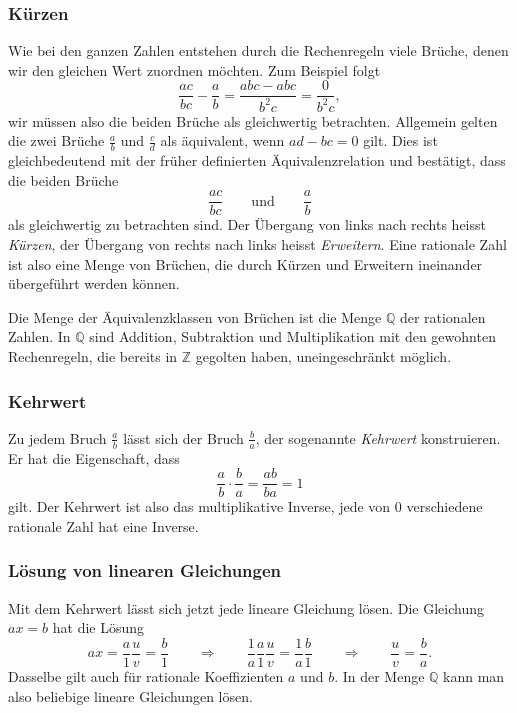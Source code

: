 \subsubsection{Kürzen}
Wie bei den ganzen Zahlen entstehen durch die Rechenregeln viele Brüche,
denen wir den gleichen Wert zuordnen möchten.
Zum Beispiel folgt
\[
\frac{ac}{bc} - \frac{a}{b} 
=
\frac{abc-abc}{b^2c}
=
\frac{0}{b^2c},
\]
wir müssen also die beiden Brüche als gleichwertig betrachten.
Allgemein gelten die zwei Brüche $\frac{a}{b}$ und $\frac{c}{d}$
als äquivalent, wenn $ad-bc= 0$ gilt.
Dies ist gleichbedeutend mit der früher definierten Äquivalenzrelation
und bestätigt, dass die beiden Brüche
\[
\frac{ac}{bc} 
\qquad\text{und}\qquad
\frac{a}{b}
\]
als gleichwertig zu betrachten sind.
Der Übergang von links nach rechts heisst {\em Kürzen},
%
der Übergang von rechts nach links heisst {\em Erweitern}.
%
Eine rationale Zahl ist also eine Menge von Brüchen, die durch
Kürzen und Erweitern ineinander übergeführt werden können.

Die Menge der Äquivalenzklassen von Brüchen ist die Menge $\mathbb{Q}$
der rationalen Zahlen.
In $\mathbb{Q}$ sind Addition, Subtraktion und Multiplikation mit den
gewohnten Rechenregeln, die bereits in $\mathbb{Z}$ gegolten haben,
uneingeschränkt möglich.

\subsubsection{Kehrwert}
Zu jedem Bruch $\frac{a}{b}$ lässt sich der Bruch $\frac{b}{a}$,
der sogenannte {\em Kehrwert}
konstruieren.
Er hat die Eigenschaft, dass
\[
\frac{a}{b}\cdot\frac{b}{a}
=
\frac{ab}{ba}
=
1
\]
gilt.
Der Kehrwert ist also das multiplikative Inverse, jede von $0$ verschiedene
rationale Zahl hat eine Inverse.

\subsubsection{Lösung von linearen Gleichungen}
Mit dem Kehrwert lässt sich jetzt jede lineare Gleichung lösen.
%
Die Gleichung $ax=b$ hat die Lösung
\[
ax = \frac{a}{1} \frac{u}{v} = \frac{b}{1}
\qquad\Rightarrow\qquad
\frac{1}{a}
 \frac{a}{1} \frac{u}{v} = \frac{1}{a}\frac{b}{1} 
\qquad\Rightarrow\qquad
\frac{u}{v} = \frac{b}{a}.
\]
Dasselbe gilt auch für rationale Koeffizienten $a$ und $b$.
In der Menge $\mathbb{Q}$ kann man also beliebige lineare Gleichungen
lösen.

